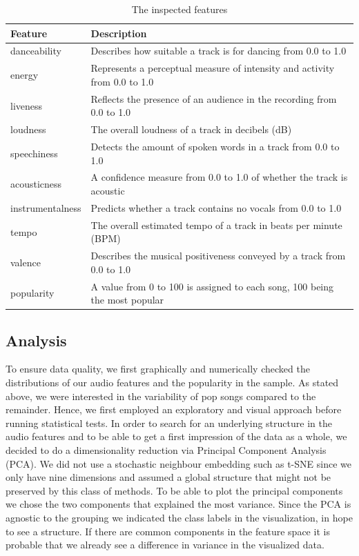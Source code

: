 \documentclass{article}
\begin{document}
\begin{table}[t]
  \centering
  \begin{tabular}{ll}
    \toprule
    Feature     & Description\\
    \midrule
	danceability        	& Describes how suitable a track is for dancing from 0.0 to 1.0  \\
	energy              	&  Represents a perceptual measure of intensity and activity from 0.0 to 1.0\\
	liveness            	&  Reflects the presence of an audience in the recording from 0.0 to 1.0\\
	loudness            	&  The overall loudness of a track in decibels (dB)\\
	speechiness         	&  Detects the amount of spoken words in a track from 0.0 to 1.0\\
	acousticness        	& A confidence measure from 0.0 to 1.0 of whether the track is acoustic	\\
	instrumentalness    	& Predicts whether a track contains no vocals  from 0.0 to 1.0 \\
	tempo               	&  The overall estimated tempo of a track in beats per minute (BPM)\\
	valence             	& Describes the musical positiveness conveyed by a track from 0.0 to 1.0\\
	\midrule
	popularity           &  A value from 0 to 100 is assigned to each song, 100 being the most popular\\
    \bottomrule
  \end{tabular}
  \vspace*{2mm}
  \caption{The inspected features}
  \label{tab:features}
\end{table}


\subsection{Analysis}
To ensure data quality, we first graphically and numerically checked the distributions of our audio features and the popularity in the sample.
As stated above, we were interested in the variability of pop songs compared to the remainder. Hence, we first employed an exploratory and visual approach before running statistical tests. In order to search for an underlying structure in the audio features and to be able to get a first impression of the data as a whole, we decided to do a dimensionality reduction via Principal Component Analysis (PCA). We did not use a stochastic neighbour embedding such as t-SNE since we only have nine dimensions and assumed a global structure that might not be preserved by this class of methods. To be able to plot the principal components we chose the two components that explained the most variance. Since the PCA is agnostic to the grouping we indicated the class labels in the visualization, in hope to see a structure. If there are common components in the feature space it is probable that we already see a difference in variance in the visualized data.
\end{document}
